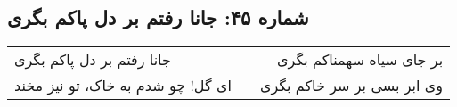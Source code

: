\begin{center}
\section*{شماره ۴۵: جانا رفتم بر دل پاکم بگری}
\label{sec:045}
\begin{longtable}{l p{0.5cm} r}
جانا رفتم بر دل پاکم بگری
&&
بر جای سیاه سهمناکم بگری
\\
ای گل! چو شدم به خاک، تو نیز مخند
&&
وی ابر بسی بر سر خاکم بگری
\\
\end{longtable}
\end{center}
